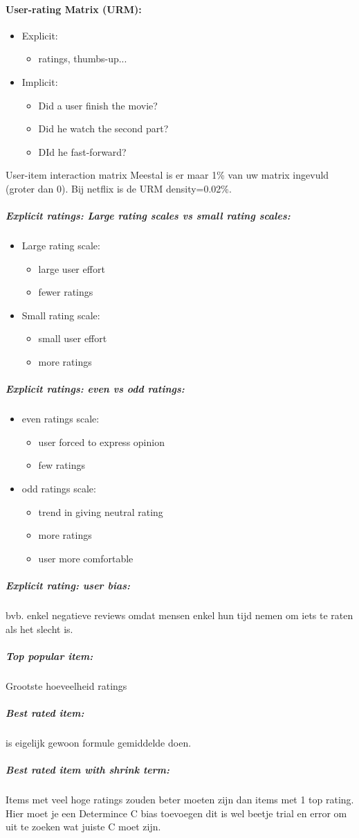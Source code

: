 \documentclass[12pt]{article}
\begin{document}
\paragraph{User-rating Matrix (URM):}
\begin{itemize}
    \item Explicit:\begin{itemize}
        \item ratings, thumbs-up...
    \end{itemize} 
    \item Implicit:\begin{itemize}
        \item Did a user finish the movie?
        \item Did he watch the second part?
        \item DId he fast-forward?
    \end{itemize}
\end{itemize}
User-item interaction matrix 
Meestal is er maar 1\% van uw matrix ingevuld (groter dan 0). Bij netflix is de URM density=0.02\%.
\subparagraph{Explicit ratings: Large rating scales vs small rating scales:}
\begin{itemize}
    \item Large rating scale:\begin{itemize}
        \item large user effort 
        \item fewer ratings
    \end{itemize}
    \item Small rating scale:\begin{itemize}
        \item small user effort 
        \item more ratings
    \end{itemize}
\end{itemize}
\subparagraph{Explicit ratings: even vs odd ratings:}
\begin{itemize}
    \item even ratings scale:\begin{itemize}
        \item user forced to express opinion
        \item few ratings
    \end{itemize}
    \item odd ratings scale:\begin{itemize}
        \item trend in giving neutral rating 
        \item more ratings 
        \item user more comfortable
    \end{itemize}
\end{itemize}
\subparagraph{Explicit rating: user bias:}
bvb. enkel negatieve reviews omdat mensen enkel hun tijd nemen om iets te raten als het slecht is.
\subparagraph{Top popular item:}
Grootste hoeveelheid ratings
\subparagraph{Best rated item:}
is eigelijk gewoon formule gemiddelde doen.
\subparagraph{Best rated item with shrink term:}
Items met veel hoge ratings zouden beter moeten zijn dan items met 1 top rating. Hier moet je een Determince C bias toevoegen dit is wel beetje trial en error om uit te zoeken wat juiste C moet zijn.
\end{document}
